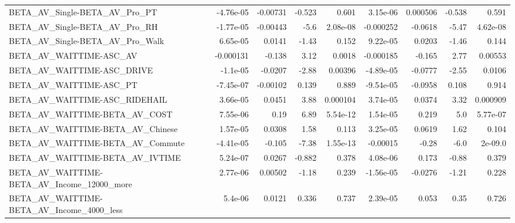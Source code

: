 \begin{tabular}{lrrrrrrrr}
BETA\_AV\_Single-BETA\_AV\_Pro\_PT                      &   -4.76e-05 &     -0.00731 &    -0.523 &    0.601 &   3.15e-06 &    0.000506 &       -0.538 &         0.591 \\
BETA\_AV\_Single-BETA\_AV\_Pro\_RH                      &   -1.77e-05 &     -0.00443 &      -5.6 & 2.08e-08 &  -0.000252 &     -0.0618 &        -5.47 &      4.62e-08 \\
BETA\_AV\_Single-BETA\_AV\_Pro\_Walk                    &    6.65e-05 &       0.0141 &     -1.43 &    0.152 &   9.22e-05 &      0.0203 &        -1.46 &         0.144 \\
BETA\_AV\_WAITTIME-ASC\_AV                            &   -0.000131 &       -0.138 &      3.12 &   0.0018 &  -0.000185 &      -0.165 &         2.77 &       0.00553 \\
BETA\_AV\_WAITTIME-ASC\_DRIVE                         &    -1.1e-05 &      -0.0207 &     -2.88 &  0.00396 &  -4.89e-05 &     -0.0777 &        -2.55 &        0.0106 \\
BETA\_AV\_WAITTIME-ASC\_PT                            &   -7.45e-07 &     -0.00102 &     0.139 &    0.889 &  -9.54e-05 &     -0.0958 &        0.108 &         0.914 \\
BETA\_AV\_WAITTIME-ASC\_RIDEHAIL                      &    3.66e-05 &       0.0451 &      3.88 & 0.000104 &   3.74e-05 &      0.0374 &         3.32 &      0.000909 \\
BETA\_AV\_WAITTIME-BETA\_AV\_COST                      &    7.55e-06 &         0.19 &      6.89 & 5.54e-12 &   1.54e-05 &       0.219 &          5.0 &      5.77e-07 \\
BETA\_AV\_WAITTIME-BETA\_AV\_Chinese                   &    1.57e-05 &       0.0308 &      1.58 &    0.113 &   3.25e-05 &      0.0619 &         1.62 &         0.104 \\
BETA\_AV\_WAITTIME-BETA\_AV\_Commute                   &   -4.41e-05 &       -0.105 &     -7.38 & 1.55e-13 &   -0.00015 &       -0.28 &         -6.0 &       2e-09.0 \\
BETA\_AV\_WAITTIME-BETA\_AV\_IVTIME                    &    5.24e-07 &       0.0267 &    -0.882 &    0.378 &   4.08e-06 &       0.173 &        -0.88 &         0.379 \\
BETA\_AV\_WAITTIME-BETA\_AV\_Income\_12000\_more         &    2.77e-06 &      0.00502 &     -1.18 &    0.239 &  -1.56e-05 &     -0.0276 &        -1.21 &         0.228 \\
BETA\_AV\_WAITTIME-BETA\_AV\_Income\_4000\_less          &     5.4e-06 &       0.0121 &     0.336 &    0.737 &   2.39e-05 &       0.053 &         0.35 &         0.726 \\

\end{tabular}
